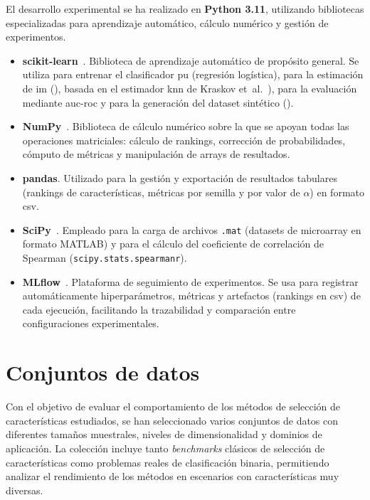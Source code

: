 El desarrollo experimental se ha realizado en \textbf{Python 3.11}, utilizando bibliotecas especializadas para aprendizaje automático, cálculo numérico y gestión de experimentos.

\begin{itemize}

  \item \textbf{scikit-learn}~\cite{pedregosa2011sklearn}.  
  Biblioteca de aprendizaje automático de propósito general. Se utiliza para entrenar el clasificador \acrshort{pu} (regresión logística), para la estimación de \acrshort{im} (), basada en el estimador \acrshort{knn} de Kraskov et~al.~\cite{kraskov2004estimating}), para la evaluación mediante \acrshort{auc}-\acrshort{roc} y para la generación del dataset sintético ().

  \item \textbf{NumPy}~\cite{harris2020array}.  
  Biblioteca de cálculo numérico sobre la que se apoyan todas las operaciones matriciales: cálculo de rankings, corrección de probabilidades, cómputo de métricas y manipulación de arrays de resultados.

  \item \textbf{pandas}.  
  Utilizado para la gestión y exportación de resultados tabulares (rankings de características, métricas por semilla y por valor de $\alpha$) en formato \acrshort{csv}.

  \item \textbf{SciPy}~\cite{virtanen2020scipy}.  
  Empleado para la carga de archivos \texttt{.mat} (datasets de microarray en formato MATLAB) y para el cálculo del coeficiente de correlación de Spearman (\texttt{scipy.\allowbreak stats.\allowbreak spearmanr}).

  \item \textbf{MLflow}~\cite{zaharia2018mlflow}.  
  Plataforma de seguimiento de experimentos. Se usa para registrar automáticamente hiperparámetros, métricas y artefactos (rankings en \acrshort{csv}) de cada ejecución, facilitando la trazabilidad y comparación entre configuraciones experimentales.

\end{itemize}


\section{Conjuntos de datos}
\label{sec:datasets}

Con el objetivo de evaluar el comportamiento de los métodos de selección de características estudiados, se han seleccionado varios conjuntos de datos con diferentes tamaños muestrales, niveles de dimensionalidad y dominios de aplicación. La colección incluye tanto \textit{benchmarks} clásicos de selección de características como problemas reales de clasificación binaria, permitiendo analizar el rendimiento de los métodos en escenarios con características muy diversas.

